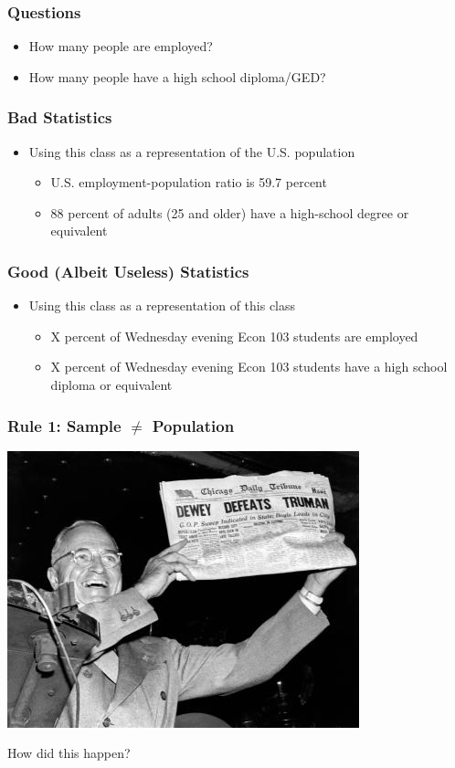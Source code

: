 \documentclass[handout]{beamer}
\begin{document}
\begin{frame}
\frametitle{Questions}
	\begin{itemize}[<+- | alert@+>]
		\item How many people are employed?
		\item How many people have a high school diploma/GED?
	\end{itemize}
\end{frame}

\begin{frame}
\frametitle{Bad Statistics}
	\begin{itemize}
		\item Using this class as a representation of the U.S. population
		\begin{itemize}
			\item U.S. employment-population ratio is 59.7 percent
			\item 88 percent of adults (25 and older) have a high-school degree or equivalent
		\end{itemize}
	\end{itemize}
\end{frame}

\begin{frame}
\frametitle{Good (Albeit Useless) Statistics}
	\begin{itemize}
		\item Using this class as a representation of this class
		\begin{itemize}
			\item X percent of Wednesday evening Econ 103 students are employed
			\item X percent of Wednesday evening Econ 103 students have a high school diploma 				or equivalent
		\end{itemize}
	\end{itemize}
\end{frame}

\begin{frame}
\frametitle{Rule 1: Sample $\neq$ Population}
	\begin{center}
		\includegraphics[scale=0.5]{./images/truman.jpg}
	\end{center}
	\centering
	How did this happen?
\end{frame}
\end{document}
